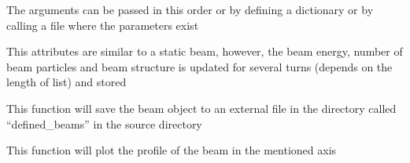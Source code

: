 \documentclass[letterpaper,10pt,english]{sphinxmanual}
\begin{document}
The arguments can be passed in this order or by defining a dictionary or by calling a file where the parameters exist

\begin{fulllineitems}
\label{beam:beam.dynamicbeam}
This attributes are similar to a static beam, however, the beam energy, number of beam particles and beam structure is updated for several turns (depends on the length of list) and stored

\begin{fulllineitems}
\label{beam:beam.dynamicbeam.save}
This function will save the beam object to an external file in the directory called ``defined\_beams'' in the source directory

\end{fulllineitems}


\end{fulllineitems}


\begin{fulllineitems}
\label{beam:beam.plot}
This function will plot the profile of the beam in the mentioned axis

\end{fulllineitems}

\end{document}
